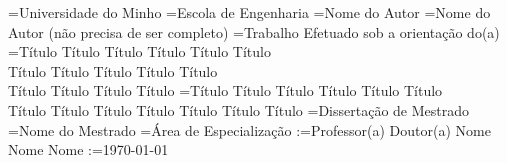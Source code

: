 
\UM={Universidade do Minho}
\UMSchool={Escola de Engenharia}
\UMAuthor[cover]={Nome do Autor}
\UMAuthor[spine]={Nome do Autor (não precisa de ser completo)}
\UMSupervisedby={Trabalho Efetuado sob a orientação do(a)}
\UMTitle[cover]={Título Título Título Título Título Título\\Título Título Título Título Título\\Título Título Título Título}
\UMTitle[spine]={Título Título Título Título Título Título\\Título Título Título Título Título Título Título}
\UMWorktype={Dissertação de Mestrado}
\UMDegree={Nome do Mestrado}
\UMSpeciality={Área de Especialização}
\UMSupervisorStr[1]:={Professor(a) Doutor(a) Nome Nome Nome}
\UMDate:=\today
